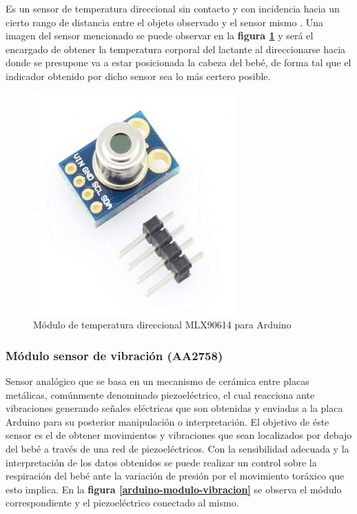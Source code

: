 \documentclass{IEEEtran}
\begin{document}
				Es un sensor de temperatura direccional sin contacto y con incidencia hacia un cierto rango de distancia entre el objeto observado y el sensor mismo \cite{temperaturatecnico}. Una imagen del sensor mencionado se puede observar en la \textbf{figura \ref{arduino-modulo-temperatura}} y será el encargado de obtener la temperatura corporal del lactante al direccionarse hacia donde se presupone va a estar posicionada la cabeza del bebé, de forma tal que el indicador obtenido por dicho sensor sea lo más certero posible.

				\begin{figure}
					\centering
					\includegraphics[width=0.5\linewidth]{arduino-modulo-temperatura}
					\caption{Módulo de temperatura direccional MLX90614 para Arduino}
					\label{arduino-modulo-temperatura}
				\end{figure}

			\subsubsection{Módulo sensor de vibración (\textbf{AA2758})}
			
				Sensor analógico que se basa en un mecanismo de cerámica entre placas metálicas, comúnmente denominado piezoeléctrico, el cual reacciona ante vibraciones generando señales eléctricas que son obtenidas y enviadas a la placa Arduino para su posterior manipulación o interpretación. El objetivo de éste sensor es el de obtener movimientos y vibraciones que sean localizados por debajo del bebé a través de una red de piezoeléctricos. Con la sensibilidad adecuada y la interpretación de los datos obtenidos se puede realizar un control sobre la respiración del bebé ante la variación de presión por el movimiento toráxico que esto implica. En la \textbf{figura \ref{arduino-modulo-vibracion}} se observa el módulo correspondiente y el piezoeléctrico conectado al mismo.
\end{document}
